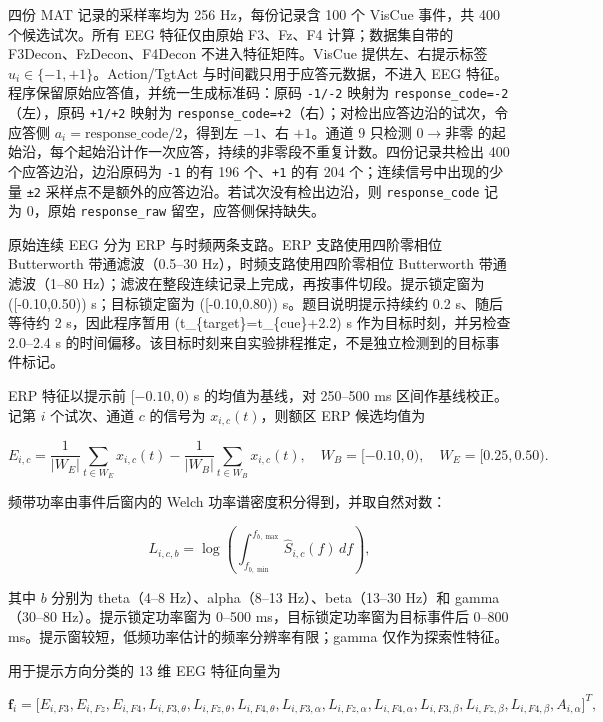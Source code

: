\documentclass[
]{article}
\begin{document}
四份 MAT 记录的采样率均为 256 Hz，每份记录含 100 个 VisCue 事件，共 400
个候选试次。所有 EEG 特征仅由原始 F3、Fz、F4 计算；数据集自带的
F3Decon、FzDecon、F4Decon 不进入特征矩阵。VisCue 提供左、右提示标签
\(u_i\in\{-1,+1\}\)。Action/TgtAct 与时间戳只用于应答元数据，不进入 EEG
特征。程序保留原始应答值，并统一生成标准码：原码 \texttt{-1/-2} 映射为
\texttt{response\_code=-2}（左），原码 \texttt{+1/+2} 映射为
\texttt{response\_code=+2}（右）；对检出应答边沿的试次，令应答侧
\(a_i=\text{response\_code}/2\)，得到左 \(-1\)、右 \(+1\)。通道 9 只检测
\(0\to\text{非零}\)
的起始沿，每个起始沿计作一次应答，持续的非零段不重复计数。四份记录共检出
400 个应答边沿，边沿原码为 \texttt{-1} 的有 196 个、\texttt{+1} 的有 204
个；连续信号中出现的少量 \texttt{±2}
采样点不是额外的应答边沿。若试次没有检出边沿，则 \texttt{response\_code}
记为 0，原始 \texttt{response\_raw} 留空，应答侧保持缺失。

原始连续 EEG 分为 ERP 与时频两条支路。ERP 支路使用四阶零相位 Butterworth
带通滤波（0.5--30 Hz），时频支路使用四阶零相位 Butterworth
带通滤波（1--80
Hz）；滤波在整段连续记录上完成，再按事件切段。提示锁定窗为
({[}-0.10,0.50)) s；目标锁定窗为 ({[}-0.10,0.80)) s。题目说明提示持续约
0.2 s、随后等待约 2 s，因此程序暂用 (t\_\{target\}=t\_\{cue\}+2.2) s
作为目标时刻，并另检查 2.0--2.4 s
的时间偏移。该目标时刻来自实验排程推定，不是独立检测到的目标事件标记。

ERP 特征以提示前 \([-0.10,0)\) s 的均值为基线，对 250--500 ms
区间作基线校正。记第 \(i\) 个试次、通道 \(c\) 的信号为
\(x_{i,c}(t)\)，则额区 ERP 候选均值为

\[
E_{i,c}=\frac{1}{|W_E|}\sum_{t\in W_E}x_{i,c}(t)-\frac{1}{|W_B|}\sum_{t\in W_B}x_{i,c}(t),
\quad W_B=[-0.10,0),\quad W_E=[0.25,0.50).
\]

频带功率由事件后窗内的 Welch 功率谱密度积分得到，并取自然对数：

\[
L_{i,c,b}=\log\left(\int_{f_{b,\min}}^{f_{b,\max}}\widehat S_{i,c}(f)\,df\right),
\]

其中 \(b\) 分别为 theta（4--8 Hz）、alpha（8--13 Hz）、beta（13--30
Hz）和 gamma（30--80 Hz）。提示锁定功率窗为 0--500
ms，目标锁定功率窗为目标事件后 0--800
ms。提示窗较短，低频功率估计的频率分辨率有限；gamma 仅作为探索性特征。

用于提示方向分类的 13 维 EEG 特征向量为

\[
\mathbf f_i=\big[E_{i,F3},E_{i,Fz},E_{i,F4},
L_{i,F3,\theta},L_{i,Fz,\theta},L_{i,F4,\theta},
L_{i,F3,\alpha},L_{i,Fz,\alpha},L_{i,F4,\alpha},
L_{i,F3,\beta},L_{i,Fz,\beta},L_{i,F4,\beta},
A_{i,\alpha}\big]^T,
\]
\end{document}
